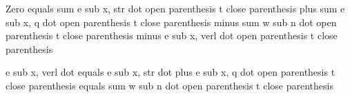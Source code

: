 Zero equals sum e sub x, str dot open parenthesis t close parenthesis plus sum e sub x, q dot open parenthesis t close parenthesis minus sum w sub n dot open parenthesis t close parenthesis minus e sub x, verl dot open parenthesis t close parenthesis

e sub x, verl dot equals e sub x, str dot plus e sub x, q dot open parenthesis t close parenthesis equals sum w sub n dot open parenthesis t close parenthesis